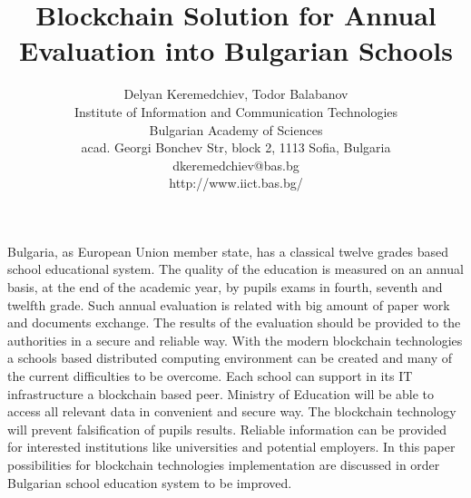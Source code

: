 \documentclass[12pt,a4paper]{article}
\title{\bf Blockchain Solution for Annual Evaluation into Bulgarian Schools}
\author{Delyan Keremedchiev, Todor Balabanov \\
Institute of Information and Communication Technologies \\
Bulgarian Academy of Sciences \\
acad. Georgi Bonchev Str, block 2, 1113 Sofia, Bulgaria \\
dkeremedchiev@bas.bg \\
http://www.iict.bas.bg/}
\date{}
\begin{document}
\maketitle

Bulgaria, as European Union member state, has a classical twelve grades based school educational system. The quality of the education is measured on an annual basis, at the end of the academic year, by pupils exams in fourth, seventh and twelfth grade. Such annual evaluation is related with big amount of paper work and documents exchange. The results of the evaluation should be provided to the authorities in a secure and reliable way. With the modern blockchain technologies a schools based distributed computing environment can be created and many of the current difficulties to be overcome. Each school can support in its IT infrastructure a blockchain based peer. Ministry of Education will be able to access all relevant data in convenient and secure way. The blockchain technology will prevent falsification of pupils results. Reliable information can be provided for interested institutions like universities and potential employers. In this paper possibilities for blockchain technologies implementation are discussed in order Bulgarian school education system to be improved.
\end{document}
